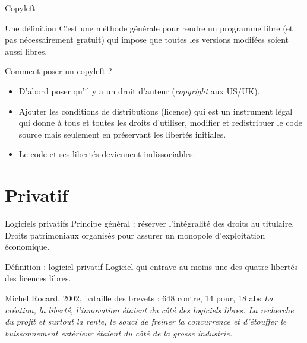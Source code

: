 \documentclass{beamer}
\begin{document}
\begin{frame}{Copyleft}

  \begin{block}{Une définition}
    C'est une méthode générale pour rendre un programme libre (et pas
    nécessairement gratuit) qui impose que toutes les versions
    modifées soient aussi libres.
  \end{block}

  \begin{block}{Comment poser un copyleft ?}
    \begin{itemize}
    \item D'abord poser qu'il y a un droit d'auteur
      (\textit{copyright} aux US/UK).
    \item Ajouter les conditions de distributions (licence) qui est un
      instrument légal qui donne à tous et toutes les droits
      d'utiliser, modifier et redistribuer le code source mais
      seulement en préservant les libertés initiales.
    \item Le code et ses libertés deviennent indissociables.
    \end{itemize}

  \end{block}

    
\end{frame}

\section{Privatif}


\begin{frame}{Logiciels privatifs}
  Principe général : réserver l'intégralité des droits au
  titulaire. Droits patrimoniaux organisés pour assurer un monopole
  d'exploitation économique.

  \begin{alertblock}{Définition : logiciel privatif}
    Logiciel qui entrave au moins une des quatre libertés des licences
    libres.
  \end{alertblock}

  \pause

  \begin{block}{Michel Rocard, 2002, bataille des brevets : 648 contre, 14 pour, 18 abs}
    \textit{ La création, la liberté, l'innovation étaient du côté des
      logiciels libres. La recherche du profit et surtout la rente, le
      souci de freiner la concurrence et d'étouffer le buissonnement
      extérieur étaient du côté de la grosse industrie.  }
  \end{block}
\end{frame}
\end{document}
